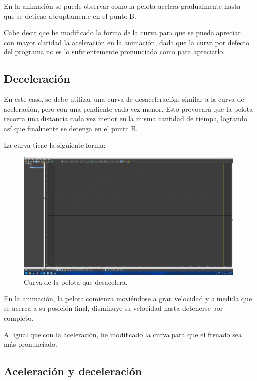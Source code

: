 \documentclass{article}
\begin{document}
{En la animación se puede observar como la pelota acelera gradualmente hasta que se detiene abruptamente en el punto B.


Cabe decir que he modificado la forma de la curva para que se pueda apreciar con mayor claridad la aceleración en la animación, dado que la curva por defecto del programa no es lo suficientemente pronunciada como para apreciarlo.

\subsection{Deceleración}

En este caso, se debe utilizar una curva de desaceleración, similar a la curva de aceleración, pero con una pendiente cada vez menor. Esto provocará que la pelota recorra una distancia cada vez menor en la misma cantidad de tiempo, logrando así que finalmente se detenga en el punto B.

La curva tiene la siguiente forma:

\begin{figure}[H]
    \centering
    \includegraphics[width=\textwidth]{imagenes/Ejercicio 1/curvas/deceleracion.png}
    \caption{Curva de la pelota que desacelera.}
\end{figure}


En la animación, la pelota comienza moviéndose a gran velocidad y a medida que se acerca a su posición final, disminuye su velocidad hasta detenerse por completo.

Al igual que con la aceleración, he modificado la curva para que el frenado sea más pronunciado.

\subsection{Aceleración y deceleración}

}
\end{document}
